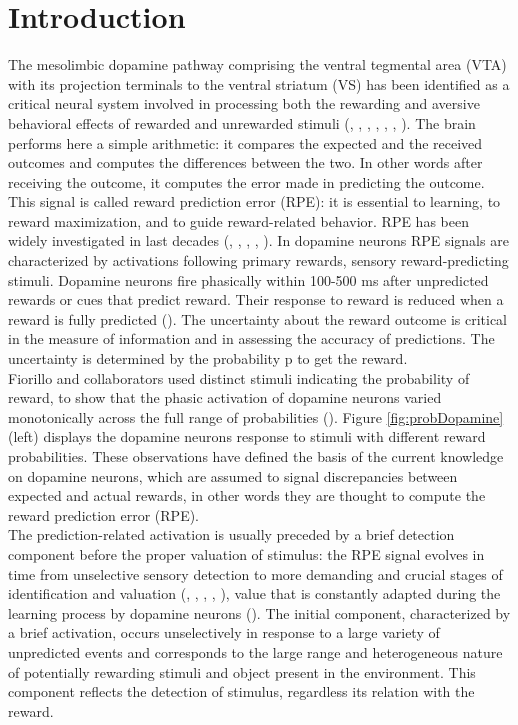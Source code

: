 \chapter{Introduction}
\label{chap:Introduction}
The mesolimbic dopamine pathway comprising the ventral tegmental area (VTA) with its projection terminals to the ventral striatum (VS) has been identified as a critical neural system involved in processing both the rewarding and aversive behavioral effects of rewarded and unrewarded stimuli (\cite{Schultz1992}, \cite{Montague}, \cite{Ungless2004}, \cite{Sun2014}, \cite{Tobler2003}, \cite{UchidaDop1}, \cite{Takahashi2016}). The brain performs here a simple arithmetic: it compares the expected and the received outcomes and computes the differences between the two. In other words after receiving the outcome, it computes the error made in predicting the outcome. This signal is called reward prediction  error (RPE): it is essential to learning, to reward maximization, and to guide reward-related behavior. RPE has been widely investigated in last decades (\cite{Schultz1997}, \cite{UchidaDop}, \cite{Fiorillo}, \cite{Pagnoni}, \cite{Schultz2016}). In dopamine neurons RPE signals are characterized by activations following primary rewards, sensory reward-predicting stimuli. Dopamine neurons fire phasically within 100-500 ms after unpredicted rewards or cues that predict reward. Their response to reward is reduced when a reward is fully predicted (\cite{Uchida}). The uncertainty about the reward outcome is critical in the measure of information and in assessing the accuracy of predictions. The uncertainty is determined by the probability p to get the reward.\\Fiorillo and collaborators used distinct stimuli indicating the probability of reward, to show that the phasic activation of dopamine neurons varied monotonically across the full range of probabilities (\cite{Fiorillo}). Figure \ref{fig:probDopamine} (left) displays the dopamine neurons response to stimuli with different reward probabilities. These observations have defined the basis of the current knowledge on dopamine neurons, which are assumed to signal discrepancies between expected and actual rewards, in other words they are thought to compute the reward prediction error (RPE).\\The prediction-related activation is usually preceded by a brief detection component before the proper valuation of stimulus: the RPE signal evolves in time from unselective sensory detection to more demanding and crucial stages of identification and valuation (\cite{Tobler2003}, \cite{Nomoto2010}, \cite{Fiorillo2013}, \cite{deLafuente}, \cite{Schultz2016}), value that is constantly adapted during the learning process by dopamine neurons (\cite{Tobler2005}). The initial component, characterized by a brief activation, occurs unselectively in response to a large variety of unpredicted events and corresponds to the large range and heterogeneous nature of potentially rewarding stimuli and object present in the environment. This component reflects the detection of stimulus, regardless its relation with the reward.
